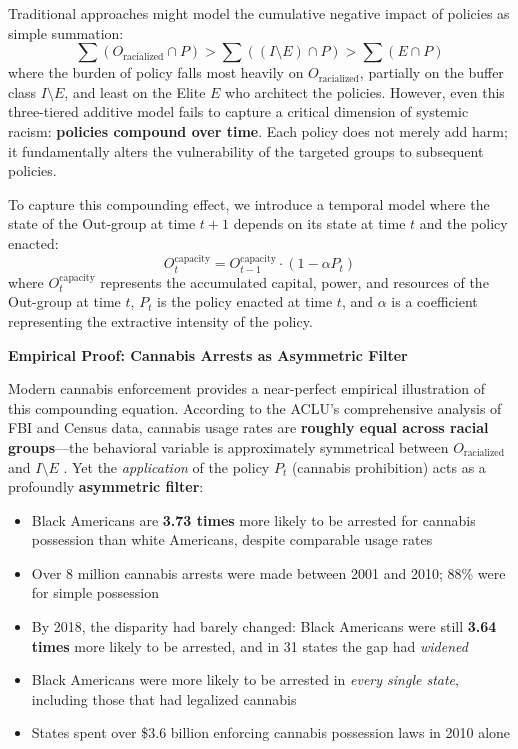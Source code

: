 \documentclass[12pt,openany]{book}
\begin{document}
Traditional approaches might model the cumulative negative impact of policies as simple summation:
\[
\sum (O_{\text{racialized}} \cap P) > \sum ((I \setminus E) \cap P) > \sum (E \cap P)
\]
where the burden of policy falls most heavily on $O_{\text{racialized}}$, partially on the buffer class $I \setminus E$, and least on the Elite $E$ who architect the policies. However, even this three-tiered additive model fails to capture a critical dimension of systemic racism: \textbf{policies compound over time}. Each policy does not merely add harm; it fundamentally alters the vulnerability of the targeted groups to subsequent policies.

To capture this compounding effect, we introduce a temporal model where the state of the Out-group at time $t+1$ depends on its state at time $t$ and the policy enacted:
\[
O_t^{\text{capacity}} = O_{t-1}^{\text{capacity}} \cdot (1 - \alpha P_t)
\]
where $O_t^{\text{capacity}}$ represents the accumulated capital, power, and resources of the Out-group at time $t$, $P_t$ is the policy enacted at time $t$, and $\alpha$ is a coefficient representing the extractive intensity of the policy.

\textbf{Empirical Proof: Cannabis Arrests as Asymmetric Filter}

Modern cannabis enforcement provides a near-perfect empirical illustration of this compounding equation. According to the ACLU's comprehensive analysis of FBI and Census data, cannabis usage rates are \textbf{roughly equal across racial groups}---the behavioral variable is approximately symmetrical between $O_{\text{racialized}}$ and $I \setminus E$ \cite{aclu2013}. Yet the \textit{application} of the policy $P_t$ (cannabis prohibition) acts as a profoundly \textbf{asymmetric filter}:

\begin{itemize}
    \item Black Americans are \textbf{3.73 times} more likely to be arrested for cannabis possession than white Americans, despite comparable usage rates \cite{aclu2013}
    \item Over 8 million cannabis arrests were made between 2001 and 2010; 88\% were for simple possession
    \item By 2018, the disparity had barely changed: Black Americans were still \textbf{3.64 times} more likely to be arrested, and in 31 states the gap had \textit{widened} \cite{aclu2020}
    \item Black Americans were more likely to be arrested in \textit{every single state}, including those that had legalized cannabis
    \item States spent over \$3.6 billion enforcing cannabis possession laws in 2010 alone
\end{itemize}
\end{document}
